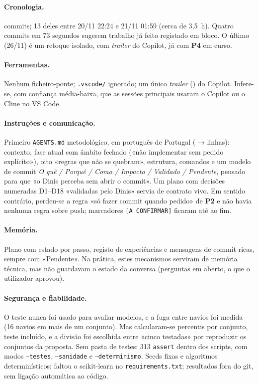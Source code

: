 \documentclass[11pt,a4paper]{article}
\newcommand{\Pdois}{\textbf{P2}}
\newcommand{\Pquatro}{\textbf{P4}}
\begin{document}
\paragraph{Cronologia.} \mTresCommits{} commits; 13 deles entre 20/11 22:24 e 21/11
01:59 (cerca de 3,5~h). Quatro commits em 73 segundos sugerem trabalho já feito registado em
bloco. O último (26/11) é um retoque isolado, com \emph{trailer} do Copilot, já com \Pquatro{}
em curso.

\paragraph{Ferramentas.} Nenhum ficheiro-ponte; \texttt{.vscode/} ignorado; um único
\emph{trailer} (\mTresCoAutorCopilot) do Copilot. Infere-se, com confiança média-baixa, que as sessões
principais usaram o Copilot ou o Cline no VS Code.

\paragraph{Instruções e comunicação.} Primeiro \texttt{AGENTS.md} metodológico, em
português de Portugal (\mTresAgentsPrimeiro{} → \mTresAgentsLinhas{} linhas): contexto, fase atual
com âmbito fechado («não implementar sem pedido explícito»), oito «regras que não se quebram»,
estrutura, comandos e um modelo de commit \emph{O quê / Porquê / Como / Impacto / Validado /
Pendente}, pensado para que «o Dinis perceba sem abrir o commit». Um plano com decisões numeradas
D1--D18 «validadas pelo Dinis» servia de contrato vivo. Em sentido contrário, perdeu-se a regra
«só fazer commit quando pedido» de \Pdois{} e não havia nenhuma regra sobre push; marcadores
\texttt{[A CONFIRMAR]} ficaram até ao fim.

\paragraph{Memória.} Plano com estado por passo, registo de experiências e mensagens de
commit ricas, sempre com «Pendente». Na prática, estes mecanismos serviram de memória técnica, mas não guardavam o
estado da conversa (perguntas em aberto, o que o utilizador aprovou).

\paragraph{Segurança e fiabilidade.} O teste nunca foi usado para avaliar modelos, e a
fuga entre navios foi medida (16 navios em mais de um conjunto). Mas calcularam-se percentis por
conjunto, teste incluído, e a divisão foi escolhida entre «cinco testadas» por reproduzir os
conjuntos da proposta. Sem pasta de testes: 313 \texttt{assert} dentro dos scripts, com modos
\texttt{--testes}, \texttt{--sanidade} e \texttt{--determinismo}. Seeds fixas e algoritmos
determinísticos; faltou o scikit-learn no \texttt{requirements.txt}; resultados fora do git, sem
ligação automática ao código.
\end{document}
